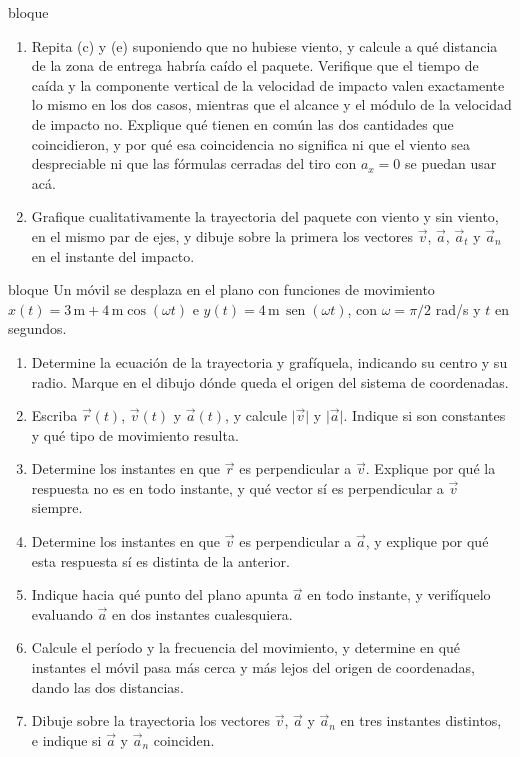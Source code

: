 \documentclass[11pt,openany]{book}
\newcommand{\sen}{\operatorname{sen}}
\begin{document}
\begin{ejercicio}{bloque}
\begin{enumerate}[label=(\alph*), leftmargin=1.7em, itemsep=1pt, topsep=3pt]
  \item Repita (c) y (e) suponiendo que no hubiese viento, y calcule a qué distancia de la zona de entrega habría caído el paquete. Verifique que el tiempo de caída y la componente vertical de la velocidad de impacto valen exactamente lo mismo en los dos casos, mientras que el alcance y el módulo de la velocidad de impacto no. Explique qué tienen en común las dos cantidades que coincidieron, y por qué esa coincidencia no significa ni que el viento sea despreciable ni que las fórmulas cerradas del tiro con $a_x = 0$ se puedan usar acá.
  \item Grafique cualitativamente la trayectoria del paquete con viento y sin viento, en el mismo par de ejes, y dibuje sobre la primera los vectores $\vec v$, $\vec a$, $\vec a_t$ y $\vec a_n$ en el instante del impacto.
\end{enumerate}
\end{ejercicio}

\begin{ejercicio}{bloque}
Un móvil se desplaza en el plano con funciones de movimiento $x(t) = 3\,\mathrm{m} + 4\,\mathrm{m}\cos(\omega t)$ e $y(t) = 4\,\mathrm{m}\,\sen(\omega t)$, con $\omega = \pi/2$ rad/s y $t$ en segundos.
\begin{enumerate}[label=(\alph*), leftmargin=1.7em, itemsep=1pt, topsep=3pt]
  \item Determine la ecuación de la trayectoria y grafíquela, indicando su centro y su radio. Marque en el dibujo dónde queda el origen del sistema de coordenadas.
  \item Escriba $\vec r(t)$, $\vec v(t)$ y $\vec a(t)$, y calcule $\lvert\vec v\rvert$ y $\lvert\vec a\rvert$. Indique si son constantes y qué tipo de movimiento resulta.
  \item Determine los instantes en que $\vec r$ es perpendicular a $\vec v$. Explique por qué la respuesta no es en todo instante, y qué vector sí es perpendicular a $\vec v$ siempre.
  \item Determine los instantes en que $\vec v$ es perpendicular a $\vec a$, y explique por qué esta respuesta sí es distinta de la anterior.
  \item Indique hacia qué punto del plano apunta $\vec a$ en todo instante, y verifíquelo evaluando $\vec a$ en dos instantes cualesquiera.
  \item Calcule el período y la frecuencia del movimiento, y determine en qué instantes el móvil pasa más cerca y más lejos del origen de coordenadas, dando las dos distancias.
  \item Dibuje sobre la trayectoria los vectores $\vec v$, $\vec a$ y $\vec a_n$ en tres instantes distintos, e indique si $\vec a$ y $\vec a_n$ coinciden.
\end{enumerate}
\end{ejercicio}
\end{document}

